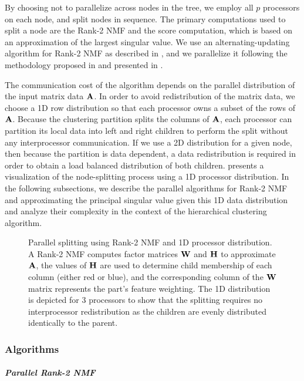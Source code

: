 \documentclass[conference,compsoc]{IEEEtran}
\begin{document}
By choosing not to parallelize across nodes in the tree, we employ all $p$ processors on each node, and split nodes in sequence.
The primary computations used to split a node are the Rank-2 NMF and the score computation, which is based on an approximation of the largest singular value.
We use an alternating-updating algorithm for Rank-2 NMF as described in , and we parallelize it following the methodology proposed in \cite{EH+19-TR} and presented in .

The communication cost of the algorithm depends on the parallel distribution of the input matrix data $\M{A}$.
In order to avoid redistribution of the matrix data, we choose a 1D row distribution so that each processor owns a subset of the rows of $\M{A}$.
Because the clustering partition splits the columns of $\M{A}$, each processor can partition its local data into left and right children to perform the split without any interprocessor communication.
If we use a 2D distribution for a given node, then because the partition is data dependent, a data redistribution is required in order to obtain a load balanced distribution of both children.
 presents a visualization of the node-splitting process using a 1D processor distribution.
In the following subsections, we describe the parallel algorithms for Rank-2 NMF and approximating the principal singular value given this 1D data distribution and analyze their complexity in the context of the hierarchical clustering algorithm.

\begin{figure}

\caption{Parallel splitting using Rank-2 NMF and 1D processor distribution.  A Rank-2 NMF computes factor matrices $\M{W}$ and $\M{H}$ to approximate $\M{A}$, the values of $\M{H}$ are used to determine child membership of each column (either red or blue), and the corresponding column of the $\M{W}$ matrix represents the part's feature weighting.  The 1D distribution is depicted for 3 processors to show that the splitting requires no interprocessor redistribution as the children are evenly distributed identically to the parent.}
\label{fig:split}
\end{figure}

\subsubsection{Algorithms}

\paragraph{\emph{Parallel Rank-2 NMF}}
\end{document}
